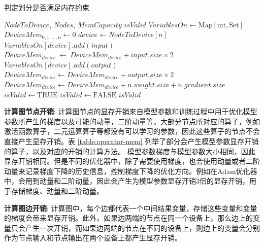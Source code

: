 \begin{algorithm}[h]
	\caption{判定划分是否满足内存约束}
	\label{alg:estimate-mem}
	\begin{algorithmic}[1]
	\REQUIRE $\mathit{NodeToDevice}$, $\mathit{Nodes}$, $\mathit{MemCapacity}$
	\ENSURE  $\mathit{isValid}$
	\STATE   $\mathit{VariablesOn} \leftarrow \mathrm{Map}[\mathrm{int}, \mathrm{Set}]$
	\STATE   $\mathit{DeviceMem}_{0,1,\dots,n} \leftarrow 0$
		\STATE $device \leftarrow \mathit{NodeToDevice}[n]$
				\STATE $\mathit{VariablesOn}[device].add(input)$
				\STATE $\mathit{DeviceMem}_{device}\ \leftarrow \ \mathit{DeviceMem}_{device} + input.size \times 2 $
			\ENDIF
		\ENDFOR
				\STATE $\mathit{VariablesOn}[device].add(output)$
				\STATE $\mathit{DeviceMem}_{device} \leftarrow  \mathit{DeviceMem}_{device} + output.size \times 2 $
			\ENDIF
		\ENDFOR
		\STATE $\mathit{DeviceMem}_{device} \leftarrow  \mathit{DeviceMem}_{device} + n.weight.size + n.gradient.size$
	\ENDFOR
	\STATE $\mathit{isValid}\leftarrow \mathrm{TRUE}$
			\STATE $\mathit{isValid}\leftarrow \mathrm{FALSE}$
		\ENDIF
	\ENDFOR
	\RETURN $\mathit{isValid}$
	\end{algorithmic}
\end{algorithm}

\textbf{计算图节点开销}: 计算图节点的显存开销来自模型参数和训练过程中用于优化模型参数所产生的梯度以及可能的动量，二阶动量等。大部分节点所对应的算子，例如激活函数算子，二元运算算子等都没有可以学习的参数，因此这些算子的节点不会直接产生显存开销。表 \ref{table:operator-mem} 列举了部分会产生模型参数显存开销的算子，以及对应的开销的计算方法。
模型参数梯度与模型参数大小相同，因此显存开销相同。但是不同的优化器中，除了需要使用梯度，也会使用动量或者二阶动量来记录梯度下降的历史信息，控制梯度下降的优化方向。例如在Adam优化器 中，会用到动量和二阶动量，因此会产生为模型参数显存开销3倍的显存开销，用于存储梯度、动量和二阶动量。

\textbf{计算图边开销}: 计算图中，每个边都代表一个中间结果变量，存储这些变量和变量的梯度会带来显存开销。此外，如果边两端的节点在同一个设备上，那么边上的变量只会产生一次开销，而如果边两端的节点在不同的设备上，则边上的变量会分别作为节点输入和节点输出在两个设备上都产生显存开销。

